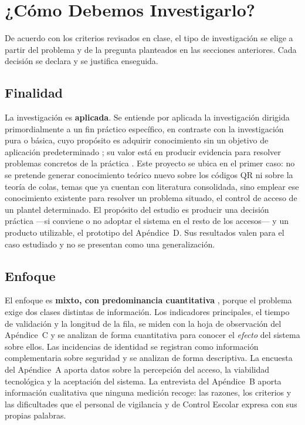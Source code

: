 \section{¿Cómo Debemos Investigarlo?}
De acuerdo con los criterios revisados en clase, el tipo de investigación se
elige a partir del problema y de la pregunta planteados en las secciones
anteriores. Cada decisión se declara y se justifica enseguida.

\subsection{Finalidad}
La investigación es \textbf{aplicada}. Se entiende por aplicada la
investigación dirigida primordialmente a un fin práctico específico, en
contraste con la investigación pura o básica, cuyo propósito es adquirir
conocimiento sin un objetivo de aplicación predeterminado
\parencite{oecd2015frascati}; su valor está en producir evidencia para
resolver problemas concretos de la práctica \parencite{vargascordero2009aplicada}.
Este proyecto se ubica en el primer caso: no se pretende generar conocimiento
teórico nuevo sobre los códigos QR ni sobre la teoría de colas, temas que ya
cuentan con literatura consolidada, sino emplear ese conocimiento existente
para resolver un problema situado, el control de acceso de un plantel
determinado. El propósito del estudio es producir una decisión práctica —si
conviene o no adoptar el sistema en el resto de los accesos— y un producto
utilizable, el prototipo del Apéndice~D. Sus resultados valen para el caso
estudiado y no se presentan como una generalización.

\subsection{Enfoque}
El enfoque es \textbf{mixto, con predominancia cuantitativa}
\parencite{hernandezsampieri2014metodologia}, porque el problema exige dos
clases distintas de información. Los indicadores principales, el tiempo de
validación y la longitud de la fila, se miden con la hoja de observación del
Apéndice~C y se analizan de forma cuantitativa para conocer el \emph{efecto}
del sistema sobre ellos. Las incidencias de identidad se registran como
información complementaria sobre seguridad y se analizan de forma descriptiva.
La encuesta del Apéndice~A aporta datos sobre la percepción del acceso, la
viabilidad tecnológica y la aceptación del sistema.
La entrevista del Apéndice~B aporta información
cualitativa que ninguna medición recoge: las razones, los criterios y las
dificultades que el personal de vigilancia y de Control Escolar expresa con
sus propias palabras.

